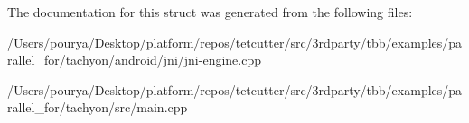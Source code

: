 The documentation for this struct was generated from the following files\+:\begin{DoxyCompactItemize}
\item 
/\+Users/pourya/\+Desktop/platform/repos/tetcutter/src/3rdparty/tbb/examples/parallel\+\_\+for/tachyon/android/jni/jni-\/engine.\+cpp\item 
/\+Users/pourya/\+Desktop/platform/repos/tetcutter/src/3rdparty/tbb/examples/parallel\+\_\+for/tachyon/src/main.\+cpp\end{DoxyCompactItemize}
